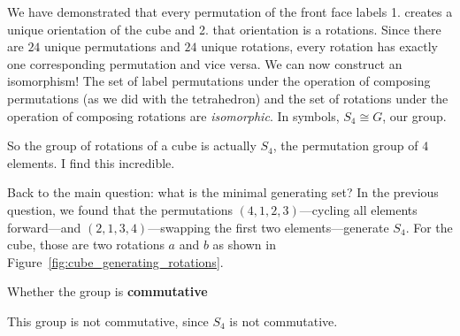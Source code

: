 \documentclass[../key.tex]{subfiles}
\begin{document}
\noindent We have demonstrated that every permutation of the front face labels 1. creates a unique orientation of the cube and 2. that orientation is a rotations. Since there are $24$ unique permutations and $24$ unique rotations, every rotation has exactly one corresponding permutation and vice versa. We can now construct an isomorphism! The set of label permutations under the operation of composing permutations (as we did with the tetrahedron) and the set of rotations under the operation of composing rotations are \textit{isomorphic}. In symbols, $S_4\cong G$, our group.

So the group of rotations of a cube is actually $S_4$, the permutation group of $4$ elements. I find this incredible.

Back to the main question: what is the minimal generating set? In the previous question, we found that the permutations $(4,1,2,3)$---cycling all elements forward---and $(2,1,3,4)$---swapping the first two elements---generate $S_4$. For the cube, those are two rotations $a$ and $b$ as shown in Figure~\ref{fig:cube_generating_rotations}.

\begin{inner_problem}
\item Whether the group is \textbf{commutative}
\end{inner_problem}

\noindent This group is not commutative, since $S_4$ is not commutative.
\end{document}
